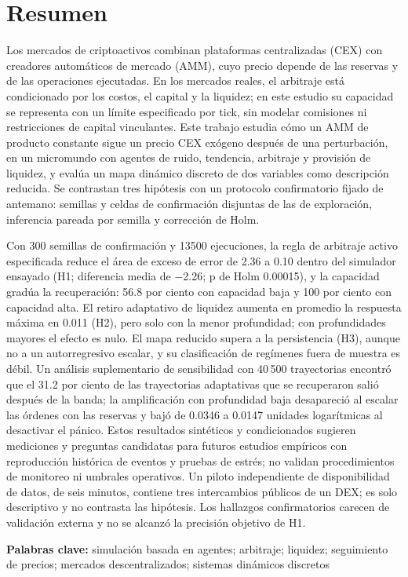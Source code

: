 \section{Resumen}

Los mercados de criptoactivos combinan plataformas centralizadas (CEX) con creadores automáticos de mercado (AMM), cuyo precio depende de las reservas y de las operaciones ejecutadas. En los mercados reales, el arbitraje está condicionado por los costos, el capital y la liquidez; en este estudio su capacidad se representa con un límite especificado por tick, sin modelar comisiones ni restricciones de capital vinculantes. Este trabajo estudia cómo un AMM de producto constante sigue un precio CEX exógeno después de una perturbación, en un micromundo con agentes de ruido, tendencia, arbitraje y provisión de liquidez, y evalúa un mapa dinámico discreto de dos variables como descripción reducida. Se contrastan tres hipótesis con un protocolo confirmatorio fijado de antemano: semillas y celdas de confirmación disjuntas de las de exploración, inferencia pareada por semilla y corrección de Holm.

Con 300 semillas de confirmación y 13500 ejecuciones, la regla de arbitraje activo especificada reduce el área de exceso de error de 2.36 a 0.10 dentro del simulador ensayado (H1; diferencia media de −2.26; p de Holm 0.00015), y la capacidad gradúa la recuperación: 56.8 por ciento con capacidad baja y 100 por ciento con capacidad alta. El retiro adaptativo de liquidez aumenta en promedio la respuesta máxima en 0.011 (H2), pero solo con la menor profundidad; con profundidades mayores el efecto es nulo. El mapa reducido supera a la persistencia (H3), aunque no a un autorregresivo escalar, y su clasificación de regímenes fuera de muestra es débil. Un análisis suplementario de sensibilidad con 40\,500 trayectorias encontró que el 31.2 por ciento de las trayectorias adaptativas que se recuperaron salió después de la banda; la amplificación con profundidad baja desapareció al escalar las órdenes con las reservas y bajó de 0.0346 a 0.0147 unidades logarítmicas al desactivar el pánico. Estos resultados sintéticos y condicionados sugieren mediciones y preguntas candidatas para futuros estudios empíricos con reproducción histórica de eventos y pruebas de estrés; no validan procedimientos de monitoreo ni umbrales operativos. Un piloto independiente de disponibilidad de datos, de seis minutos, contiene tres intercambios públicos de un DEX; es solo descriptivo y no contrasta las hipótesis. Los hallazgos confirmatorios carecen de validación externa y no se alcanzó la precisión objetivo de H1.

\textbf{Palabras clave:} simulación basada en agentes; arbitraje; liquidez; seguimiento de precios; mercados descentralizados; sistemas dinámicos discretos
